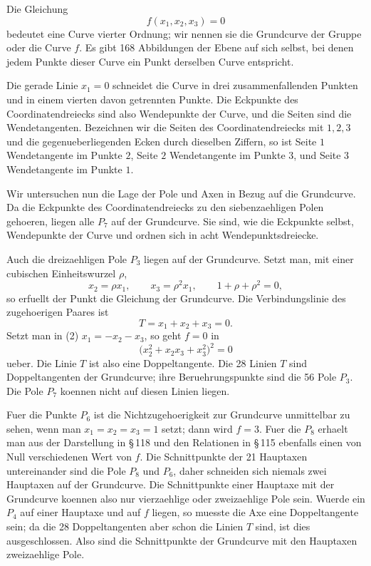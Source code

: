 \documentclass[11pt]{article}
\begin{document}
Die Gleichung
\begin{equation}
f(x_1,x_2,x_3)=0
\tag{5}
\end{equation}
bedeutet eine Curve vierter Ordnung; wir nennen sie die Grundcurve der Gruppe oder die Curve \(f\). Es gibt 168 Abbildungen der Ebene auf sich selbst, bei denen jedem Punkte dieser Curve ein Punkt derselben Curve entspricht.

Die gerade Linie \(x_1=0\) schneidet die Curve in drei zusammenfallenden Punkten und in einem vierten davon getrennten Punkte. Die Eckpunkte des Coordinatendreiecks sind also Wendepunkte der Curve, und die Seiten sind die Wendetangenten. Bezeichnen wir die Seiten des Coordinatendreiecks mit \(1,2,3\) und die gegenueberliegenden Ecken durch dieselben Ziffern, so ist Seite \(1\) Wendetangente im Punkte \(2\), Seite \(2\) Wendetangente im Punkte \(3\), und Seite \(3\) Wendetangente im Punkte \(1\).

Wir untersuchen nun die Lage der Pole und Axen in Bezug auf die Grundcurve. Da die Eckpunkte des Coordinatendreiecks zu den siebenzaehligen Polen gehoeren, liegen alle \(P_7\) auf der Grundcurve. Sie sind, wie die Eckpunkte selbst, Wendepunkte der Curve und ordnen sich in acht Wendepunktsdreiecke.

Auch die dreizaehligen Pole \(P_3\) liegen auf der Grundcurve. Setzt man, mit einer cubischen Einheitswurzel \(\rho\),
\begin{equation}
x_2=\rho x_1,
\qquad
x_3=\rho^2x_1,
\qquad
1+\rho+\rho^2=0,
\end{equation}
so erfuellt der Punkt die Gleichung der Grundcurve. Die Verbindungslinie des zugehoerigen Paares ist
\begin{equation}
T=x_1+x_2+x_3=0.
\end{equation}
Setzt man in (2) \(x_1=-x_2-x_3\), so geht \(f=0\) in
\begin{equation}
\bigl(x_2^2+x_2x_3+x_3^2\bigr)^2=0
\end{equation}
ueber. Die Linie \(T\) ist also eine Doppeltangente. Die 28 Linien \(T\) sind Doppeltangenten der Grundcurve; ihre Beruehrungspunkte sind die 56 Pole \(P_3\). Die Pole \(P_7\) koennen nicht auf diesen Linien liegen.

Fuer die Punkte \(P_6\) ist die Nichtzugehoerigkeit zur Grundcurve unmittelbar zu sehen, wenn man \(x_1=x_2=x_3=1\) setzt; dann wird \(f=3\). Fuer die \(P_8\) erhaelt man aus der Darstellung in \S\,118 und den Relationen in \S\,115 ebenfalls einen von Null verschiedenen Wert von \(f\). Die Schnittpunkte der 21 Hauptaxen untereinander sind die Pole \(P_8\) und \(P_6\), daher schneiden sich niemals zwei Hauptaxen auf der Grundcurve. Die Schnittpunkte einer Hauptaxe mit der Grundcurve koennen also nur vierzaehlige oder zweizaehlige Pole sein. Wuerde ein \(P_4\) auf einer Hauptaxe und auf \(f\) liegen, so muesste die Axe eine Doppeltangente sein; da die 28 Doppeltangenten aber schon die Linien \(T\) sind, ist dies ausgeschlossen. Also sind die Schnittpunkte der Grundcurve mit den Hauptaxen zweizaehlige Pole.
\end{document}
